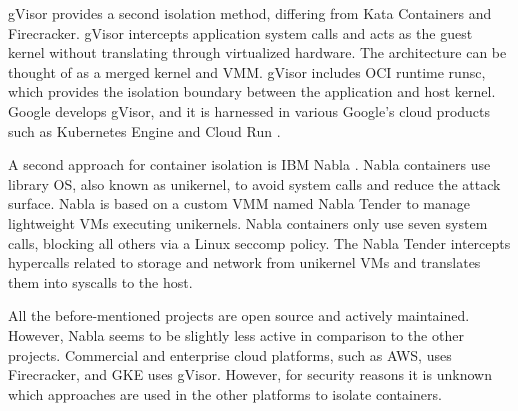 gVisor provides a second isolation method, differing from Kata Containers and Firecracker. gVisor intercepts application system calls and acts as the guest kernel without translating through virtualized hardware. The architecture can be thought of as a merged kernel and VMM. gVisor includes OCI runtime runsc, which provides the isolation boundary between the application and host kernel. Google develops gVisor, and it is harnessed in various Google's cloud products such as Kubernetes Engine \cite{GKE} and Cloud Run \cite{CloudRun}. \cite{Debab2021}\cite{gVisor}

A second approach for container isolation is IBM Nabla \cite{Nabla}. Nabla containers use library OS, also known as unikernel, to avoid system calls and reduce the attack surface. Nabla is based on a custom VMM named Nabla Tender to manage lightweight VMs executing unikernels. Nabla containers only use seven system calls, blocking all others via a Linux seccomp policy. The Nabla Tender intercepts hypercalls related to storage and network from unikernel VMs and translates them into syscalls to the host. \cite{Debab2021}

All the before-mentioned projects are open source and actively maintained. However, Nabla seems to be slightly less active in comparison to the other projects. Commercial and enterprise cloud platforms, such as AWS, uses Firecracker, and GKE uses gVisor. However, for security reasons it is unknown which approaches are used in the other platforms to isolate containers.








